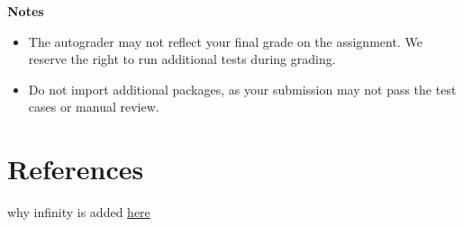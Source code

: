 \documentclass{article}
\begin{document}
    \vspace{3mm}
    \textbf{Notes}
    \begin{itemize}
        \item The autograder may not reflect your final grade on the assignment. We reserve the right to run additional tests during grading.
        \item Do not import additional packages, as your submission may not pass the test cases or manual review.
    \end{itemize}

    

\section*{References}
why infinity is added \href{https://crypto.stackexchange.com/questions/70507/in-elliptic-curve-what-does-the-point-at-infinity-look-like}{here}
\end{document}
